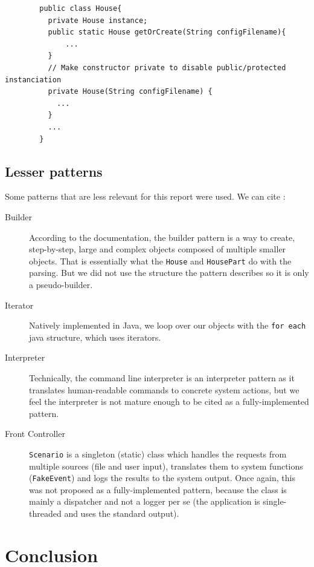         \begin{verbatim}
        public class House{
          private House instance;
          public static House getOrCreate(String configFilename){
              ...
          }
          // Make constructor private to disable public/protected instanciation
          private House(String configFilename) {
            ...
          }
          ...
        }
        \end{verbatim}

      \subsection{Lesser patterns}
        Some patterns that are less relevant for this report were used. We can cite :
        \begin{description}
          \item [Builder] According to the documentation, the builder pattern is a way to create, step-by-step, large and complex objects composed of multiple smaller objects. That is essentially what the \texttt{House} and \texttt{HousePart} do with the parsing. But we did not use the structure the pattern describes so it is only a pseudo-builder.
          \item [Iterator] Natively implemented in Java, we loop over our objects with the \texttt{for each} java structure, which uses iterators.
          \item [Interpreter] Technically, the command line interpreter is an interpreter pattern as it translates human-readable commands to concrete system actions, but we feel the interpreter is not mature enough to be cited as a fully-implemented pattern.
          \item [Front Controller] \texttt{Scenario} is a singleton (static) class which handles the requests from multiple sources (file and user input), translates them to system functions (\texttt{FakeEvent}) and logs the results to the system output. Once again, this was not proposed as a fully-implemented pattern, because the class is mainly a dispatcher and not a logger per se (the application is single-threaded and uses the standard output).
        \end{description}
	\section{Conclusion}

